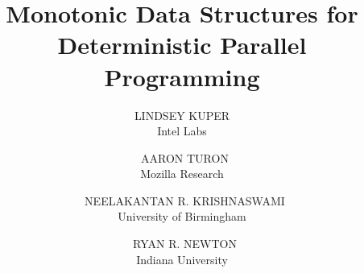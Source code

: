 \documentclass{../latex_common/jfp1}
\title{Monotonic Data Structures for Deterministic Parallel Programming}
\author[L. Kuper, A. Turon, N. R. Krishnaswami, and R. R. Newton]
       {LINDSEY KUPER\\
          Intel Labs\\
        \and\ AARON TURON\\
          Mozilla Research\\
        \and\ NEELAKANTAN R. KRISHNASWAMI\\
          University of Birmingham\\
        \and\ RYAN R. NEWTON\\
        Indiana University}
\let\oldsection\section
\let\oldsubsection\subsection
\let\oldsubsubsection\subsubsection
\renewcommand{\section}[1]{\oldsubsection{#1}}
\renewcommand{\subsection}[1]{\oldsubsubsection{#1}}
\begin{document}
\label{firstpage}

\maketitle

\begin{abstract}

\end{abstract}








\renewcommand{\section}{\oldsection}


\end{document}
